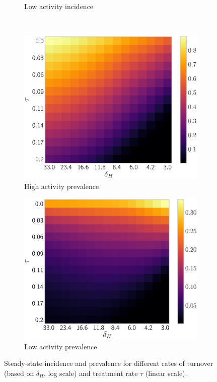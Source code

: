 \documentclass[10pt]{article}
\newlength{\figi}  \setlength{\figi}  {0.800\textwidth}
\newlength{\figii} \setlength{\figii} {0.490\textwidth}
\newlength{\figiii}\setlength{\figiii}{0.325\textwidth}
\numberwithin{equation}{section}
\begin{document}
\begin{figure}
\begin{subfigure}{\figiii}
    \caption{Low activity incidence}
    \label{fig:2d-inc-low}
  \end{subfigure}\\
  \begin{subfigure}{\figiii}
    \includegraphics[width=\textwidth]{2d-prevalence-high.eps}
    \caption{High activity prevalence}
    \label{fig:2d-prev-high}
  \end{subfigure}
  \begin{subfigure}{\figiii}
    \includegraphics[width=\textwidth]{2d-prevalence-low.eps}
    \caption{Low activity prevalence}
    \label{fig:2d-prev-low}
  \end{subfigure}
  \caption{Steady-state incidence and prevalence
    for different rates of turnover (based on $\delta_H$, log scale)
    and treatment rate $\tau$ (linear scale).}
  \label{fig:2d-inc-prev-zeta}
\end{figure}
\end{document}
